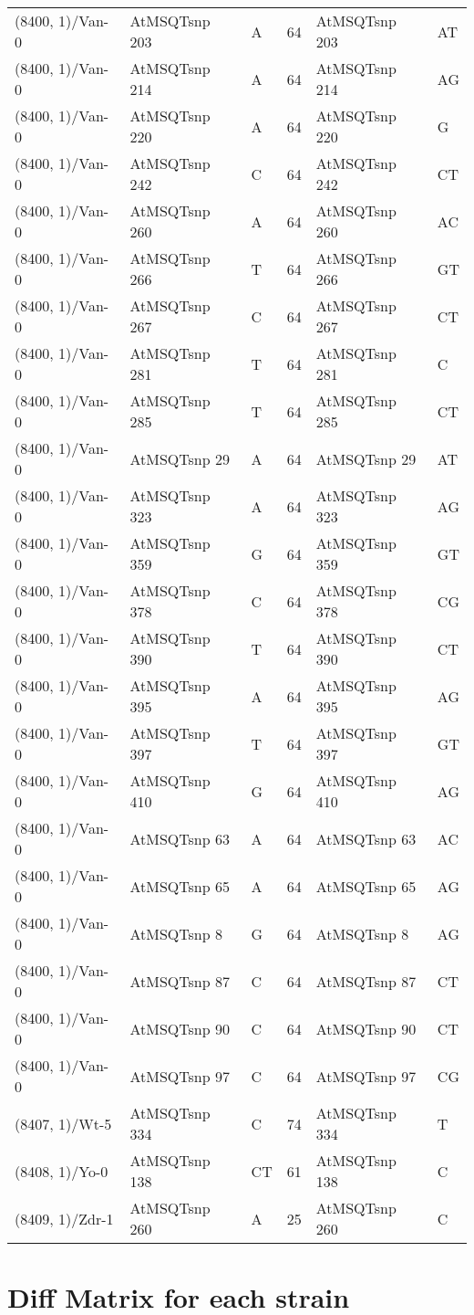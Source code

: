 \begin{center}
\begin{longtable}{|l|l|l|l|l|l|}
(8400, 1)/Van-0&AtMSQTsnp 203&A&64&AtMSQTsnp 203&AT\\
(8400, 1)/Van-0&AtMSQTsnp 214&A&64&AtMSQTsnp 214&AG\\
(8400, 1)/Van-0&AtMSQTsnp 220&A&64&AtMSQTsnp 220&G\\
(8400, 1)/Van-0&AtMSQTsnp 242&C&64&AtMSQTsnp 242&CT\\
(8400, 1)/Van-0&AtMSQTsnp 260&A&64&AtMSQTsnp 260&AC\\
(8400, 1)/Van-0&AtMSQTsnp 266&T&64&AtMSQTsnp 266&GT\\
(8400, 1)/Van-0&AtMSQTsnp 267&C&64&AtMSQTsnp 267&CT\\
(8400, 1)/Van-0&AtMSQTsnp 281&T&64&AtMSQTsnp 281&C\\
(8400, 1)/Van-0&AtMSQTsnp 285&T&64&AtMSQTsnp 285&CT\\
(8400, 1)/Van-0&AtMSQTsnp 29&A&64&AtMSQTsnp 29&AT\\
(8400, 1)/Van-0&AtMSQTsnp 323&A&64&AtMSQTsnp 323&AG\\
(8400, 1)/Van-0&AtMSQTsnp 359&G&64&AtMSQTsnp 359&GT\\
(8400, 1)/Van-0&AtMSQTsnp 378&C&64&AtMSQTsnp 378&CG\\
(8400, 1)/Van-0&AtMSQTsnp 390&T&64&AtMSQTsnp 390&CT\\
(8400, 1)/Van-0&AtMSQTsnp 395&A&64&AtMSQTsnp 395&AG\\
(8400, 1)/Van-0&AtMSQTsnp 397&T&64&AtMSQTsnp 397&GT\\
(8400, 1)/Van-0&AtMSQTsnp 410&G&64&AtMSQTsnp 410&AG\\
(8400, 1)/Van-0&AtMSQTsnp 63&A&64&AtMSQTsnp 63&AC\\
(8400, 1)/Van-0&AtMSQTsnp 65&A&64&AtMSQTsnp 65&AG\\
(8400, 1)/Van-0&AtMSQTsnp 8&G&64&AtMSQTsnp 8&AG\\
(8400, 1)/Van-0&AtMSQTsnp 87&C&64&AtMSQTsnp 87&CT\\
(8400, 1)/Van-0&AtMSQTsnp 90&C&64&AtMSQTsnp 90&CT\\
(8400, 1)/Van-0&AtMSQTsnp 97&C&64&AtMSQTsnp 97&CG\\
(8407, 1)/Wt-5&AtMSQTsnp 334&C&74&AtMSQTsnp 334&T\\
(8408, 1)/Yo-0&AtMSQTsnp 138&CT&61&AtMSQTsnp 138&C\\
(8409, 1)/Zdr-1&AtMSQTsnp 260&A&25&AtMSQTsnp 260&C\\
\hline
\end{longtable}
\end{center}

\section{Diff Matrix for each strain} \label{section_strain_wise}
